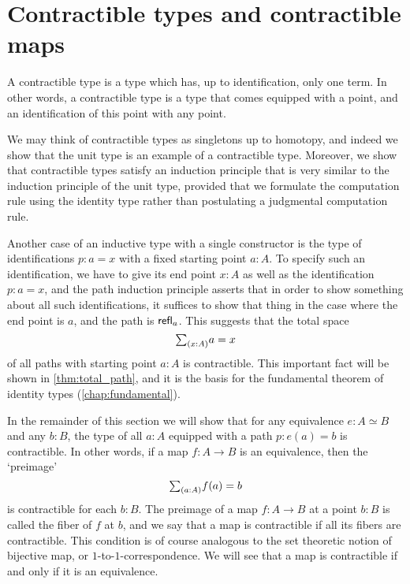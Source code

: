 
\section{Contractible types and contractible maps}

A contractible type is a type which has, up to identification, only one term. In other words, a contractible type is a type that comes equipped with a point, and an identification of this point with any point.

We may think of contractible types as singletons up to homotopy, and indeed we show that the unit type is an example of a contractible type. Moreover, we show that contractible types satisfy an induction principle that is very similar to the induction principle of the unit type, provided that we formulate the computation rule using the identity type rather than postulating a judgmental computation rule.

Another case of an inductive type with a single constructor is the type of identifications $p:a=x$ with a fixed starting point $a:A$. To specify such an identification, we have to give its end point $x:A$ as well as the identification $p:a=x$, and the path induction principle asserts that in order to show something about all such identifications, it suffices to show that thing in the case where the end point is $a$, and the path is $\mathsf{refl}_{a}$. This suggests that the total space
\begin{equation*}
  \sm{x:A}a=x
\end{equation*}
of all paths with starting point $a:A$ is contractible. This important fact will be shown in \cref{thm:total_path}, and it is the basis for the fundamental theorem of identity types (\cref{chap:fundamental}).

In the remainder of this section we will show that for any equivalence $e:A\simeq B$ and any $b:B$, the type of all $a:A$ equipped with a path $p:e(a)=b$ is contractible. In other words, if a map $f:A\to B$ is an equivalence, then the `preimage'
\begin{equation*}
  \sm{a:A}f(a)=b
\end{equation*}
is contractible for each $b:B$. The preimage of a map $f:A\to B$ at a point $b:B$ is called the fiber of $f$ at $b$, and we say that a map is contractible if all its fibers are contractible. This condition is of course analogous to the set theoretic notion of bijective map, or $1$-to-$1$-correspondence. We will see that a map is contractible if and only if it is an equivalence.

